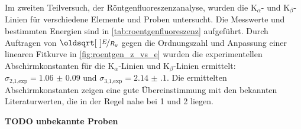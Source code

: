 \documentclass[ngerman]{scrartcl}
\begin{document}
Im zweiten Teilversuch, der Röntgenfluoreszenzanalyse, wurden die K$_{\alpha}$- und K$_{\beta}$-Linien für verschiedene Elemente und Proben untersucht. Die Messwerte und bestimmten Energien sind in \autoref{tab:roentgenfluoreszenz} aufgeführt. Durch Auftragen von $\sqrt{\nicefrac{E}{R_y}}$ gegen die Ordnungszahl und Anpassung einer linearen Fitkurve in \autoref{fig:roentgen_z_vs_e} wurden die experimentellen Abschirmkonstanten für die K$_{\alpha}$-Linien und K$_{\beta}$-Linien ermittelt: $\sigma_{\text{2,1,exp}} = \num{1.06(9)}$ und $\sigma_{\text{3,1,exp}} = \num{2.14(10)}$. Die ermittelten Abschirmkonstanten zeigen eine gute Übereinstimmung mit den bekannten Literaturwerten, die in der Regel nahe bei 1 und 2 liegen.

\textbf{TODO unbekannte Proben}



\clearpage
\printbibliography

\listoffigures

\listoftables
\end{document}
